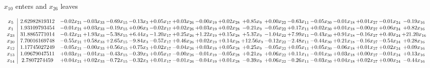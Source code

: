 \documentclass[9pt]{article}
\begin{document}
 $ x_{10} $ enters and $ x_{26} $ leaves 

 \[\begin{array}{c| c c@{\hskip 2pt} c@{\hskip 2pt} c@{\hskip 2pt} c@{\hskip 2pt} c@{\hskip 2pt} c@{\hskip 2pt} c@{\hskip 2pt} c@{\hskip 2pt} c@{\hskip 2pt} c@{\hskip 2pt} c@{\hskip 2pt} c@{\hskip 2pt} c@{\hskip 2pt} c@{\hskip 2pt} c@{\hskip 2pt} c@{\hskip 2pt} }
 x_{5}   &  2.62982819312 & -0.02 x_{21} & -0.03 x_{33} & -0.69 x_{15} & -0.13 x_{3} & +  0.05 x_{17} & +  0.03 x_{26} & -0.00 x_{19} & +  0.02 x_{28} & +  0.85 x_{9} & +  0.00 x_{22} & -0.63 x_{11} & -0.05 x_{30} & -0.01 x_{18} & +  0.01 x_{27} & -0.01 x_{24} & -0.19 x_{16}\\
 x_{1}   &  1.93109793454 & -0.01 x_{21} & +  0.03 x_{33} & -0.19 x_{15} & +  0.06 x_{3} & -0.02 x_{17} & +  0.02 x_{26} & +  0.03 x_{19} & +  0.02 x_{28} & -0.21 x_{9} & -0.05 x_{22} & +  0.17 x_{11} & +  0.02 x_{30} & +  0.01 x_{18} & -0.00 x_{27} & +  0.06 x_{24} & +  0.82 x_{16}\\
 x_{23}   &  31.8865771014 & -0.42 x_{21} & +  1.93 x_{33} & -5.38 x_{15} & +  6.44 x_{3} & -1.20 x_{17} & +  0.25 x_{26} & +  1.22 x_{19} & +  0.15 x_{28} & +  5.37 x_{9} & -1.04 x_{22} & +  7.99 x_{11} & -0.43 x_{30} & +  0.91 x_{18} & -0.16 x_{27} & +  0.40 x_{24} & + 21.20 x_{16}\\
 x_{20}   &  7.70016169748 & -0.55 x_{21} & +  0.58 x_{33} & +  2.65 x_{15} & -9.84 x_{3} & -0.57 x_{17} & +  0.46 x_{26} & +  0.02 x_{19} & +  0.14 x_{28} & + 12.56 x_{9} & -0.12 x_{22} & -2.48 x_{11} & -0.44 x_{30} & +  0.21 x_{18} & -0.16 x_{27} & -0.54 x_{24} & +  0.28 x_{16}\\
 x_{12}   &  1.17745027249 & -0.05 x_{21} & -0.00 x_{33} & +  0.56 x_{15} & +  0.75 x_{3} & +  0.02 x_{17} & -0.04 x_{26} & +  0.03 x_{19} & +  0.05 x_{28} & +  0.25 x_{9} & -0.05 x_{22} & +  0.05 x_{11} & +  0.05 x_{30} & -0.06 x_{18} & +  0.01 x_{27} & +  0.02 x_{24} & +  0.09 x_{16}\\
 x_{13}   &  1.09679047511 & +  0.03 x_{21} & -0.01 x_{33} & -0.43 x_{15} & -0.39 x_{3} & +  0.05 x_{17} & -0.00 x_{26} & -0.01 x_{19} & -0.05 x_{28} & +  0.21 x_{9} & +  0.06 x_{22} & +  0.11 x_{11} & -0.01 x_{30} & +  0.03 x_{18} & +  0.00 x_{27} & -0.01 x_{24} & +  0.13 x_{16}\\
 x_{14}   &  2.7807274459 & +  0.04 x_{21} & +  0.02 x_{33} & -0.72 x_{15} & -0.32 x_{3} & +  0.01 x_{17} & -0.01 x_{26} & -0.04 x_{19} & +  0.01 x_{28} & -0.39 x_{9} & +  0.06 x_{22} & -0.26 x_{11} & -0.03 x_{30} & +  0.04 x_{18} & +  0.02 x_{27} & +  0.00 x_{24} & -0.44 x_{16}\\

\end{array}\]
\end{document}
